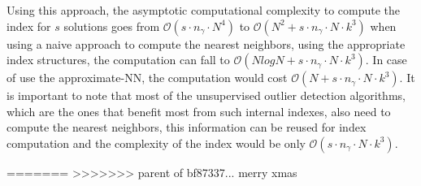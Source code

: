 Using this approach, the asymptotic computational complexity to compute the index for $s$ solutions goes from $\mathcal{O}(s \cdot n_{\gamma} \cdot N^4)$ to $\mathcal{O}(N^2 + s \cdot n_{\gamma} \cdot N \cdot k^3)$ when using a naive approach to compute the nearest neighbors, using the appropriate index structures, the computation can fall to $\mathcal{O}(N log N + s \cdot n_{\gamma} \cdot N \cdot k^3)$. In case of use the approximate-NN, the computation would cost $\mathcal{O}(N + s \cdot n_{\gamma} \cdot N \cdot k^3)$. It is important to note that most of the unsupervised outlier detection algorithms, which are the ones that benefit most from such internal indexes, also need to compute the nearest neighbors, this information can be reused for index computation and the complexity of the index would be only $\mathcal{O}(s \cdot n_{\gamma} \cdot N \cdot k^3)$.



=======
>>>>>>> parent of bf87337... merry xmas
\newpage